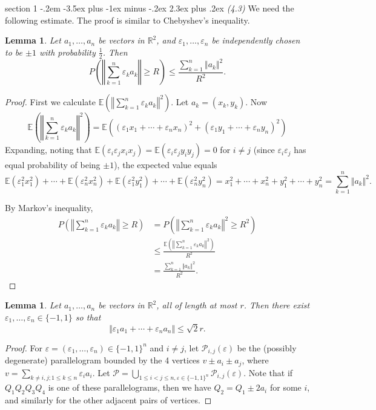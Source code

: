 \documentclass[12pt]{article}
\makeatletter
\theoremstyle{norm}
\newtheorem{lem}[thm]{Lemma}
\newcommand{\E}[0]{\mathbb{E}}
\newcommand{\R}[0]{\mathbb{R}}
\providecommand{\cal}[1]{\mathcal{#1}}
\renewcommand{\cal}[1]{\mathcal{#1}}
\newcommand{\rc}[1]{\frac{1}{#1}}
\newcommand{\ep}[0]{\varepsilon}
\newcommand{\pa}[1]{\left( {#1} \right)}
\newenvironment{problem}{\@startsection
       {section}
       {1}
       {-.2em}
       {-3.5ex plus -1ex minus -.2ex}
       {2.3ex plus .2ex}
       {\pagebreak[3]%
       \large\bf\noindent{Problem }
       }
       }
       {%
       }
\makeatother
\begin{document}
\begin{problem} {\it (4.3)}
We need the following estimate. The proof is similar to Chebyshev's inequality.
\begin{lem}\label{p3-7-l1}
Let $a_1,\ldots, a_n$ be vectors in $\R^2$, and $\ep_1,\ldots, \ep_n$ be independently chosen to be $\pm 1$ with probability $\rc2$. Then
\[
P\pa{\left\Vert\sum_{k=1}^n \ep_ka_k\right\Vert\ge R}\le\frac{\sum_{k=1}^n \Vert a_k\Vert^2}{R^2}. 
\]
\end{lem}
\begin{proof}
First we calculate $\E\pa{\left\Vert\sum_{k=1}^n \ep_ka_k\right\Vert^2}$. Let $a_k=(x_k,y_k)$. Now
\[
\E\pa{\left\Vert\sum_{k=1}^n \ep_ka_k\right\Vert^2} =\E((\ep_1x_1+\cdots +\ep_nx_n)^2+(\ep_1y_1+\cdots +\ep_ny_n)^2)\]
Expanding, noting that $\E(\ep_i\ep_jx_ix_j)=\E(\ep_i\ep_jy_iy_j)=0$ for $i\ne j$ (since $\ep_i\ep_j$ has equal probability of being $\pm1$), the expected value equals
\[
\E(\ep_1^2x_1^2)+\cdots +\E(\ep_n^2 x_n^2)+\E(\ep_1^2 y_1^2)+\cdots +\E(\ep_n^2y_n^2)=x_1^2+\cdots +x_n^2+y_1^2+\cdots +y_n^2=\sum_{k=1}^n \Vert a_k\Vert^2.
\]

By Markov's inequality,
\begin{align*}P\pa{\left\Vert\sum_{k=1}^n \ep_ka_k\right\Vert\ge R}&=
P\pa{\left\Vert\sum_{k=1}^n \ep_ka_k\right\Vert^2\ge R^2}\\
&\le \frac{\E\pa{\left\Vert\sum_{k=1}^n \ep_ka_k\right\Vert^2}}{R^2}\\
&=\frac{\sum_{k=1}^n \Vert a_k\Vert^2}{R^2}.
\end{align*}
\end{proof}
\begin{lem}\label{p3-7-l2}
Let $a_1,\ldots, a_n$ be vectors in $\R^2$, all of length at most $r$. Then there exist $\ep_1,\ldots, \ep_n\in \{-1,1\}$ so that
\[
\Vert\ep_1a_1+\cdots +\ep_na_n\Vert\le \sqrt 2r.
\]
\end{lem}
\begin{proof}
For $\ep=(\ep_1,\ldots, \ep_n)\in \{-1,1\}^n$ and $i\neq j$, let $\cal P_{i,j}(%
\ep)$ be the (possibly degenerate) parallelogram bounded by the 4 vertices $v\pm a_i\pm a_j$, where $v=\sum_{k\neq i,j; 1\le k\le n} \ep_ia_i$. Let $\cal P=\bigcup_{1\le i<j\le n, \ep\in \{-1,1\}^n} \cal P_{i,j}(\ep)$. Note that if $Q_1Q_2Q_3Q_4$ is one of these parallelograms, then we have $Q_2=Q_1\pm 2a_i$ for some $i$, and similarly for the other adjacent pairs of vertices.


\end{proof}
\end{problem}
\end{document}
